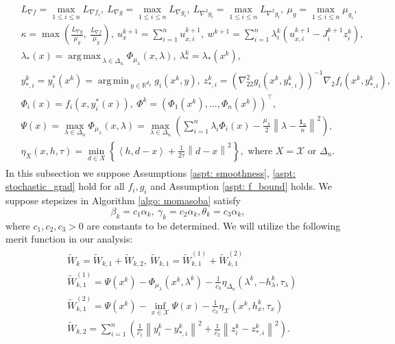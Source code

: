 \documentclass[10pt]{article}
\theoremstyle{remark}
\newcommand{\cX}{\mathcal{X}}
\newcommand{\realset}{\mathbb{R}}
\newcommand{\norm}[1]{\left\|#1\right\|}
\newcommand{\T}{^\top}
\newcommand{\bfone}{\mathbf{1}}
\DeclareMathOperator*{\argmax}{arg\,max\,}
\DeclareMathOperator*{\argmin}{arg\,min\,}
\def\<#1,#2>{\left\langle #1,#2\right\rangle}
\begin{document}
\begin{align}\label{append: notations}
    \begin{aligned}
    &L_{\nabla f} = \max_{1\leq i\leq n}L_{\nabla f_i},\ L_{\nabla g} = \max_{1\leq i\leq n}L_{\nabla g_i},\ L_{\nabla^2 g_i} = \max_{1\leq i\leq n}L_{\nabla^2 g_i},\ \mu_g = \max_{1\leq i\leq n}\mu_{g_i}, \\
        &\kappa = \max\left(\frac{L_{\nabla g}}{\mu_g},\ \frac{L_{\nabla f}}{\mu_g}\right),\ u_x^{k+1} = \sum_{i=1}^{n}u_{x,i}^{k+1},\ w^{k+1} = \sum_{i=1}^{n}\lambda_i^k\left(u_{x,i}^{k+1} - J_i^{k+1}z_i^k\right), \\
        &\lambda_*(x) = \argmax_{\lambda \in \Delta_n}\Phi_{\mu_{\lambda}}(x,\lambda),\ \lambda_*^k = \lambda_*(x^k), \\
        &y_{*,i}^k = y_i^*(x^k) = \argmin_{y\in \realset^{d_y}} g_i(x^k, y),\ z_{*,i}^k =  \left(\nabla_{22}^2g_i(x^k, y_{*,i}^k)\right)^{-1}\nabla_2f_i(x^k, y_{*,i}^k), \\
        &\Phi_i(x) = f_i(x, y_i^*(x)),\ \Phi^k = \left(\Phi_1(x^k), ..., \Phi_n(x^k)\right)\T, \\
        &\Psi(x) = \max_{\lambda\in \Delta_n} \Phi_{\mu_{\lambda}}(x,\lambda) = \max_{\lambda\in\Delta_n}\left(\sum_{i=1}^{n}\lambda_i\Phi_i(x) -\frac{\mu_{\lambda}}{2}\norm{\lambda - \frac{\bfone_n}{n}}^2\right), \\
        &\eta_{X}(x, h, \tau) = \min_{d\in X}\left\{\<h, d - x> + \frac{1}{2\tau}\norm{d-x}^2\right\}, \text{ where } X = \cX \text{ or } \Delta_n.
    \end{aligned}
\end{align}
In this subsection we suppose Assumptions \ref{aspt: smoothness}, \ref{aspt: stochastic_grad} hold for all $f_i, g_i$ and Assumption \ref{aspt: f_bound} holds. We suppose stepsizes in Algorithm \ref{algo: momasoba} satisfy
\begin{equation}\label{eq: stepsize_ratio}
    \beta_k = c_1\alpha_k,\ \gamma_k = c_2\alpha_k, \theta_k = c_3\alpha_k,
\end{equation}
where $c_1, c_2, c_3 > 0$ are constants to be determined. We will utilize the following merit function in our analysis:
\begin{align}\label{eq: merit_tilde_W}
    \begin{aligned}
        &\tilde W_k = \tilde W_{k,1} + \tilde W_{k,2},\ \tilde W_{k,1} = \tilde W_{k,1}^{(1)} + \tilde W_{k,1}^{(2)}\\
        & \tilde W_{k,1}^{(1)} = \Psi(x^k) - \Phi_{\mu_{\lambda}}(x^k,\lambda^k) - \frac{1}{c_3}\eta_{\Delta_n}(\lambda^k,-h_{\lambda}^k,\tau_{\lambda})\\
        & \tilde W_{k,1}^{(2)} = \Psi(x^k) -\inf_{x\in\cX} \Psi(x) - \frac{1}{c_3}\eta_{\cX}(x^k,h_x^k,\tau_x) \\
        &\tilde W_{k,2} = \sum_{i=1}^{n}\left(\frac{1}{c_1}\norm{y_i^k - y_{*,i}^k}^2 + \frac{1}{c_2}\norm{z_i^k - z_{*,i}^k}^2\right).
    \end{aligned}
\end{align}
\end{document}
